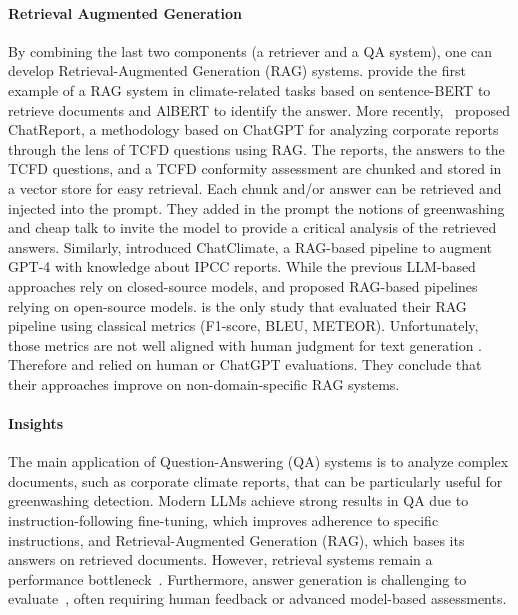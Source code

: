 \paragraph{Retrieval Augmented Generation} By combining the last two components (a retriever and a QA system), one can develop Retrieval-Augmented Generation (RAG) systems. \citet{cliamtebot_2022} provide the first example of a RAG system in climate-related tasks based on sentence-BERT to retrieve documents and AlBERT to identify the answer. More recently, \citet{jingwei_ni_paradigm_2023}~proposed ChatReport, a methodology based on ChatGPT for analyzing corporate reports through the lens of TCFD questions using RAG.  The reports, the answers to the TCFD questions, and a TCFD conformity assessment are chunked and stored in a vector store for easy retrieval. Each chunk and/or answer can be retrieved and injected into the prompt. They added in the prompt the notions of greenwashing and cheap talk to invite the model to provide a critical analysis of the retrieved answers. Similarly, \citet{s_vaghefi_chatclimate_2023} introduced ChatClimate, a RAG-based pipeline to augment GPT-4 with knowledge about IPCC reports. While the previous LLM-based approaches rely on closed-source models, \citet{mullappilly-etal-2023-arabic} and \citet{thulke2024climategpt} proposed RAG-based pipelines relying on open-source models.
\citet{cliamtebot_2022} is the only study that evaluated their RAG pipeline using classical metrics (F1-score, BLEU, METEOR). Unfortunately, those metrics are not well aligned with human judgment for text generation \cite{chen-etal-2019-evaluating}. Therefore \citet{s_vaghefi_chatclimate_2023} and \citet{mullappilly-etal-2023-arabic} relied on human or ChatGPT evaluations. They conclude that their approaches improve on non-domain-specific RAG systems.

\paragraph{Insights} The main application of Question-Answering (QA) systems is to analyze complex documents, such as corporate climate reports, that can be particularly useful for greenwashing detection. Modern LLMs achieve strong results in QA due to instruction-following fine-tuning, which improves adherence to specific instructions, and Retrieval-Augmented Generation (RAG), which bases its answers on retrieved documents. However, retrieval systems  remain a performance bottleneck~\cite{maekawa-etal-2024-retrieval}. Furthermore, answer generation is challenging to evaluate~\cite{survey_nlg_eval}, often requiring human feedback or advanced model-based assessments.


